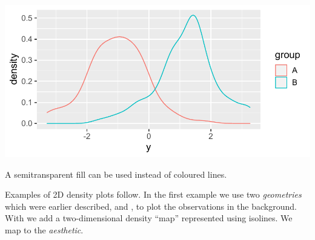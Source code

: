\documentclass[krantz2]{krantz}\usepackage{knitr}
\begin{document}
\begin{knitrout}\footnotesize
{}\color{fgcolor}\begin{kframe}
\begin{alltt}
    \hlopt{+}
  \hlstd{()}
\end{alltt}
\end{kframe}

{\centering \includegraphics[width=.7\textwidth]{figure/pos-density-plot-01-1}

}



\end{knitrout}

A semitransparent fill can be used instead of coloured lines.

\begin{knitrout}\footnotesize
{}\color{fgcolor}\begin{kframe}
\begin{alltt}
    \hlopt{+}
  \hlstd{(} \hlstd{=} \hlstd{)}
\end{alltt}
\end{kframe}
\end{knitrout}


Examples of 2D density plots follow. In the first example we use two \emph{geometries} which were earlier described,  and , to plot the observations in the background. With  we add a two-dimensional density ``map'' represented using isolines. We map  to the  \emph{aesthetic}.
\end{document}
